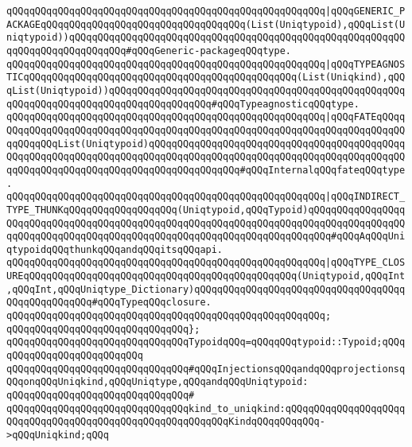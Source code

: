 \verb|qQQqqQQqqQQqqQQqqQQqqQQqqQQqqQQqqQQqqQQqqQQqqQQqqQQqqQQq|\verb#|qQQqGENERIC_PACKAGEqQQqqQQqqQQqqQQqqQQqqQQqqQQqqQQqqQQq(List(Uniqtypoid),qQQqList(Uniqtypoid))qQQqqQQqqQQqqQQqqQQqqQQqqQQqqQQqqQQqqQQqqQQqqQQqqQQqqQQqqQQqqQQqqQQqqQQqqQQqqQQq#\verb|#qQQqGeneric-packageqQQqtype.|\newline
\verb|qQQqqQQqqQQqqQQqqQQqqQQqqQQqqQQqqQQqqQQqqQQqqQQqqQQqqQQq|\verb#|qQQqTYPEAGNOSTICqQQqqQQqqQQqqQQqqQQqqQQqqQQqqQQqqQQqqQQqqQQqqQQq(List(Uniqkind),qQQqList(Uniqtypoid))qQQqqQQqqQQqqQQqqQQqqQQqqQQqqQQqqQQqqQQqqQQqqQQqqQQqqQQqqQQqqQQqqQQqqQQqqQQqqQQqqQQqqQQq#\verb|#qQQqTypeagnosticqQQqtype.|\newline
\verb|qQQqqQQqqQQqqQQqqQQqqQQqqQQqqQQqqQQqqQQqqQQqqQQqqQQqqQQq|\verb#|qQQqFATEqQQqqQQqqQQqqQQqqQQqqQQqqQQqqQQqqQQqqQQqqQQqqQQqqQQqqQQqqQQqqQQqqQQqqQQqqQQqqQQqqQQqList(Uniqtypoid)qQQqqQQqqQQqqQQqqQQqqQQqqQQqqQQqqQQqqQQqqQQqqQQqqQQqqQQqqQQqqQQqqQQqqQQqqQQqqQQqqQQqqQQqqQQqqQQqqQQqqQQqqQQqqQQqqQQqqQQqqQQqqQQqqQQqqQQqqQQqqQQqqQQqqQQqqQQq#\verb|#qQQqInternalqQQqfateqQQqtype.|\newline
\verb|qQQqqQQqqQQqqQQqqQQqqQQqqQQqqQQqqQQqqQQqqQQqqQQqqQQqqQQq|\verb#|qQQqINDIRECT_TYPE_THUNKqQQqqQQqqQQqqQQqqQQq(Uniqtypoid,qQQqTypoid)qQQqqQQqqQQqqQQqqQQqqQQqqQQqqQQqqQQqqQQqqQQqqQQqqQQqqQQqqQQqqQQqqQQqqQQqqQQqqQQqqQQqqQQqqQQqqQQqqQQqqQQqqQQqqQQqqQQqqQQqqQQqqQQqqQQqqQQqqQQqqQQq#\verb|#qQQqAqQQqUniqtypoidqQQqthunkqQQqandqQQqitsqQQqapi.|\newline
\verb|qQQqqQQqqQQqqQQqqQQqqQQqqQQqqQQqqQQqqQQqqQQqqQQqqQQqqQQq|\verb#|qQQqTYPE_CLOSUREqQQqqQQqqQQqqQQqqQQqqQQqqQQqqQQqqQQqqQQqqQQqqQQq(Uniqtypoid,qQQqInt,qQQqInt,qQQqUniqtype_Dictionary)qQQqqQQqqQQqqQQqqQQqqQQqqQQqqQQqqQQqqQQqqQQqqQQqqQQq#\verb|#qQQqTypeqQQqclosure.|\newline
\verb|qQQqqQQqqQQqqQQqqQQqqQQqqQQqqQQqqQQqqQQqqQQqqQQqqQQqqQQq;|\newline
\verb|qQQqqQQqqQQqqQQqqQQqqQQqqQQqqQQq};|\newline
\verb|qQQqqQQqqQQqqQQqqQQqqQQqqQQqqQQqTypoidqQQq=qQQqqQQqtypoid::Typoid;qQQqqQQqqQQqqQQqqQQqqQQqqQQq|\newline
\newline
\verb|qQQqqQQqqQQqqQQqqQQqqQQqqQQqqQQq#qQQqInjectionsqQQqandqQQqprojectionsqQQqonqQQqUniqkind,qQQqUniqtype,qQQqandqQQqUniqtypoid:|\newline
\verb|qQQqqQQqqQQqqQQqqQQqqQQqqQQqqQQq#|\newline
\verb|qQQqqQQqqQQqqQQqqQQqqQQqqQQqqQQqkind_to_uniqkind:qQQqqQQqqQQqqQQqqQQqqQQqqQQqqQQqqQQqqQQqqQQqqQQqqQQqqQQqqQQqKindqQQqqQQqqQQq->qQQqUniqkind;qQQq|\newline
